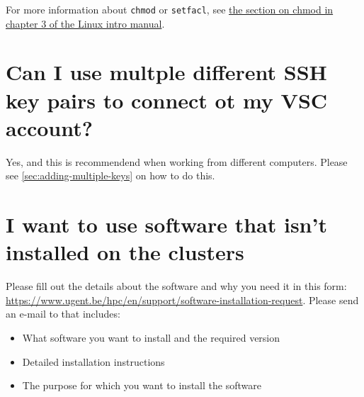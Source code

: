 For more information about \lstinline|chmod| or \lstinline|setfacl|, see \href{\LinuxManualURL#sec:chmod}
{the section on chmod in chapter 3 of the Linux intro manual}.

\section{Can I use multple different SSH key pairs to connect ot my VSC account?}

Yes, and this is recommendend when working from different computers. Please see
\autoref{sec:adding-multiple-keys} on how to do this.

\section{I want to use software that isn't installed on the clusters}

\ifgent
Please fill out the details about the software and why you need it in this form:
\url{https://www.ugent.be/hpc/en/support/software-installation-request}.
\else
Please send an e-mail to \hpcinfo that includes:
\begin{itemize}
    \item What software you want to install and the required version
    \item Detailed installation instructions
    \item The purpose for which you want to install the software
\end{itemize}
\fi
